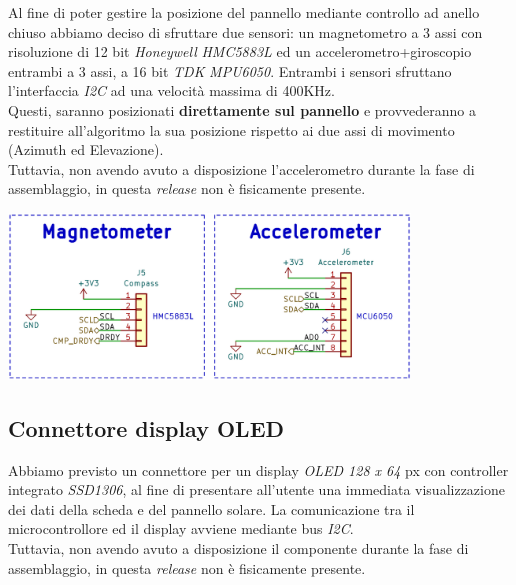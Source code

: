 Al fine di poter gestire la posizione del pannello mediante controllo ad
anello chiuso abbiamo deciso di sfruttare due sensori: un magnetometro a
3 assi con risoluzione di 12 bit \emph{Honeywell} \emph{HMC5883L} ed un
accelerometro+giroscopio entrambi a 3 assi, a 16 bit \emph{TDK}
\emph{MPU6050}. Entrambi i sensori sfruttano l'interfaccia \emph{I2C} 
ad una velocità massima di 400KHz.\\
Questi, saranno posizionati \textbf{direttamente sul pannello} e
provvederanno a restituire all'algoritmo la sua posizione
rispetto ai due assi di movimento (Azimuth ed Elevazione).\\
Tuttavia, non avendo avuto a disposizione l'accelerometro durante la
fase di assemblaggio, in questa \textit{release} non è fisicamente presente.

\begin{center}
\includegraphics[width=0.8\textwidth]{figures/image31.png}
\captionsetup{type=figure}
\end{center}

\hypertarget{connettore-display-oled}{%
\subsection{\texorpdfstring{Connettore display OLED}{Connettore display OLED }}\label{connettore-display-oled}}

Abbiamo previsto un connettore per un display \emph{OLED 128 x 64} px con
controller integrato \emph{SSD1306}, al fine di presentare all'utente una
immediata visualizzazione dei dati della scheda e del pannello solare. La comunicazione tra il microcontrollore ed il display avviene mediante bus \textit{I2C}. \\
Tuttavia, non avendo avuto a disposizione il componente durante la fase
di assemblaggio, in questa \textit{release} non è fisicamente presente.

